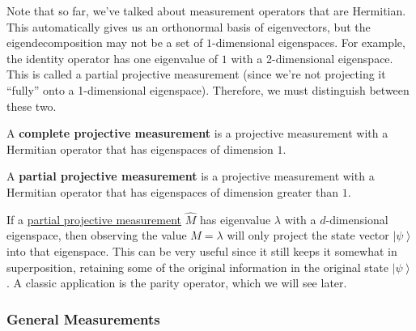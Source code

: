 \documentclass{article}
\newcommand{\ket}[1]{\ensuremath{\left|#1\right\rangle}}
\newcounter{definition}[section]
\newcounter{example}[section]
\begin{document}
      Note that so far, we've talked about measurement operators that are Hermitian. This automatically gives us an orthonormal basis of eigenvectors, but the eigendecomposition may not be a set of $1$-dimensional eigenspaces. For example, the identity operator has one eigenvalue of $1$ with a 2-dimensional eigenspace. This is called a partial projective measurement (since we're not projecting it ``fully'' onto a 1-dimensional eigenspace). Therefore, we must distinguish between these two. 

      \begin{definition}
        \label{def:complete-projective-measurement}
        A \textbf{complete projective measurement} is a projective measurement with a Hermitian operator that has eigenspaces of dimension $1$.
      \end{definition}

      \begin{definition}
        \label{def:partial-projective-measurement}
        A \textbf{partial projective measurement} is a projective measurement with a Hermitian operator that has eigenspaces of dimension greater than $1$. 
      \end{definition}

      If a \hyperref[def:partial-projective-measurement]{partial projective measurement} $\hat{M}$ has eigenvalue $\lambda$ with a $d$-dimensional eigenspace, then observing the value $M = \lambda$ will only project the state vector $\ket{\psi}$ into that eigenspace. This can be very useful since it still keeps it somewhat in superposition, retaining some of the original information in the original state $\ket{\psi}$. A classic application is the parity operator, which we will see later. 

    \subsubsection{General Measurements} 
\end{document}
